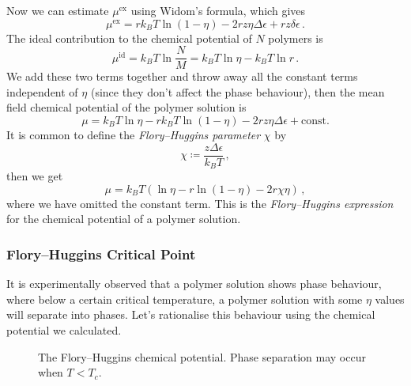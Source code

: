 \documentclass{article}
\theoremstyle{plain}\theoremheaderfont{\normalfont\bfseries}\theorembodyfont{\rmfamily}\theoremseparator{.}\newtheorem*{thm}{Theorem}\newtheorem*{law}{Law}\newtheorem*{pos}{Postulate}
\numberwithin{equation}{section}
\begin{document}
    Now we can estimate \(\mu^{\text{ex}}\) using Widom's formula, which gives
    \begin{equation}\label{Flory_Huggins_mu_ex}
        \mu^{\text{ex}}=rk_B T\ln(1-\eta)-2rz\eta\Delta\epsilon+rz\delta\epsilon\,.
    \end{equation}
    The ideal contribution to the chemical potential of \(N\) polymers is
    \begin{equation}
        \mu^{\text{id}}=k_B T\ln\frac{N}{M}=k_B T\ln\eta-k_B T\ln r\,.
    \end{equation}
    We add these two terms together and throw away all the constant terms independent of \(\eta\) (since they don't affect the phase behaviour), then the mean field chemical potential of the polymer solution is
    \begin{equation}
        \mu=k_B T\ln\eta-rk_B T\ln(1-\eta)-2rz\eta\Delta\epsilon+\text{const.}
    \end{equation}
    It is common to define the \textit{Flory--Huggins parameter} \(\chi\) by
    \begin{equation}
        \chi\coloneqq\frac{z\Delta\epsilon}{k_B T}\,,
    \end{equation}
    then we get
    \begin{equation}
        \mu=k_B T(\ln\eta-r\ln(1-\eta)-2r\chi\eta)\,,
    \end{equation}
    where we have omitted the constant term. This is the \textit{Flory--Huggins expression} for the chemical potential of a polymer solution.

    \subsubsection{Flory--Huggins Critical Point}
    It is experimentally observed that a polymer solution shows phase behaviour, where below a certain critical temperature, a polymer solution with some \(\eta\) values will separate into phases. Let's rationalise this behaviour using the chemical potential we calculated.

    \begin{figure}
        \centering
        \caption{The Flory--Huggins chemical potential. Phase separation may occur when \(T<T_c\).}
    \end{figure}
\end{document}
